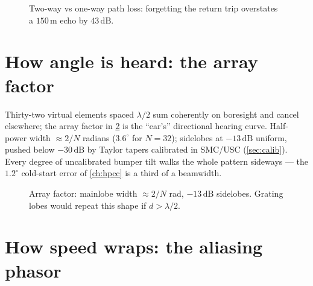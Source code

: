 \documentclass[11pt,oneside]{book}
\begin{document}
\begin{figure}[htbp]
\centering
{}
\caption{Two-way vs one-way path loss: forgetting the return trip overstates
a $150\,\mathrm{m}$ echo by $43\,\mathrm{dB}$.}
\label{fig:radar-eq}
\end{figure}

\section{How angle is heard: the array factor}
\label{sec:array-factor}

Thirty-two virtual elements spaced $\lambda/2$ sum coherently on boresight
and cancel elsewhere; the array factor in \cref{fig:array-factor} is the
``ear's'' directional hearing curve. Half-power width $\approx2/N$ radians
($3.6^\circ$ for $N=32$); sidelobes at $-13\,\mathrm{dB}$ uniform, pushed
below $-30\,\mathrm{dB}$ by Taylor tapers calibrated in SMC/USC
(\cref{sec:calib}). Every degree of uncalibrated bumper tilt walks the
whole pattern sideways --- the $1.2^\circ$ cold-start error of \cref{ch:hpcc}
is a third of a beamwidth.

\begin{figure}[htbp]
\centering
{}
\caption{Array factor: mainlobe width $\approx2/N$ rad, $-13\,\mathrm{dB}$
sidelobes. Grating lobes would repeat this shape if $d>\lambda/2$.}
\label{fig:array-factor}
\end{figure}

\section{How speed wraps: the aliasing phasor}
\label{sec:alias-phasor}
\end{document}
